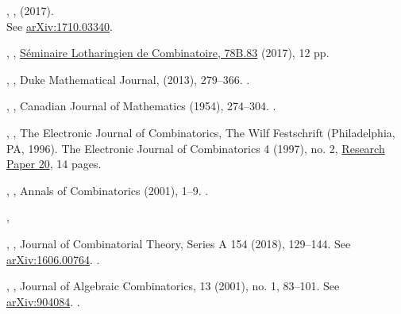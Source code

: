 \documentclass[12pt]{amsart}
\theoremstyle{plain}
\theoremstyle{definition}
\theoremstyle{remark}
\begin{document}
\begin{thebibliography}{10}
,
, (2017).\\
See \href{https://arxiv.org/pdf/1710.03340}{arXiv:1710.03340}.

,
,
\href{http://www.mat.univie.ac.at/~slc/wpapers/FPSAC2017/83\%20Qiu\%20Remmel.pdf}{S\'eminaire Lotharingien de Combinatoire, 78B.83} (2017), 12 pp.

  
,
,
Duke Mathematical Journal,  (2013), 279--366. .

, 
, 
Canadian Journal of Mathematics  (1954),  274--304. .

,
,
The Electronic Journal of Combinatorics, The Wilf Festschrift (Philadelphia, PA, 1996). The Electronic Journal of Combinatorics 4 (1997), no. 2, \href{http://www.combinatorics.org/ojs/index.php/eljc/article/view/v4i2r20}{Research Paper 20}, 14 pages. 

 ,
 ,
  Annals of Combinatorics (2001), 1--9. .
  
 
 ,
 
  ,
  ,
   Journal of Combinatorial Theory, Series A 154 (2018), 129--144.  
   See \href{http://arxiv.org/abs/1606.00764}{arXiv:1606.00764}. .
  
  ,
  ,
   Journal of Algebraic Combinatorics, 13 (2001), no. 1, 83--101.
   See \href{https://arxiv.org/pdf/math/9904084.pdf}{arXiv:904084}. .

\end{thebibliography}
\end{document}
